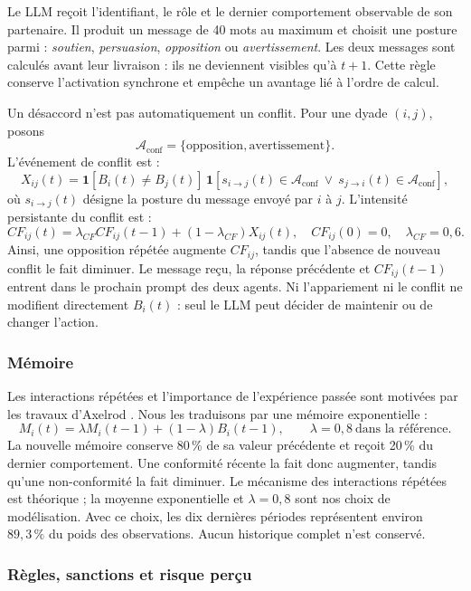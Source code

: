 \documentclass[10pt,a4paper]{article}
\begin{document}
Le LLM reçoit l’identifiant, le rôle et le dernier comportement observable de
son partenaire. Il produit un message de 40 mots au maximum et choisit une
posture parmi : \emph{soutien}, \emph{persuasion}, \emph{opposition} ou
\emph{avertissement}. Les deux messages sont calculés avant leur livraison :
ils ne deviennent visibles qu’à $t+1$. Cette règle conserve l’activation
synchrone et empêche un avantage lié à l’ordre de calcul.

Un désaccord n’est pas automatiquement un conflit. Pour une dyade $(i,j)$,
posons
\[
\mathcal A_{\mathrm{conf}}=\{\text{opposition},\text{avertissement}\}.
\]
L’événement de conflit est :
\[
X_{ij}(t)=
\mathbf 1[B_i(t)\neq B_j(t)]\,
\mathbf 1\!\left[
s_{i\rightarrow j}(t)\in\mathcal A_{\mathrm{conf}}
\ \lor\
s_{j\rightarrow i}(t)\in\mathcal A_{\mathrm{conf}}
\right],
\]
où $s_{i\rightarrow j}(t)$ désigne la posture du message envoyé par $i$ à
$j$. L’intensité persistante du conflit est :
\[
CF_{ij}(t)=\lambda_{CF}CF_{ij}(t-1)
+(1-\lambda_{CF})X_{ij}(t),
\quad CF_{ij}(0)=0,\quad \lambda_{CF}=0{,}6.
\]
Ainsi, une opposition répétée augmente $CF_{ij}$, tandis que l’absence de
nouveau conflit le fait diminuer. Le message reçu, la réponse précédente et
$CF_{ij}(t-1)$ entrent dans le prochain prompt des deux agents. Ni
l’appariement ni le conflit ne modifient directement $B_i(t)$ : seul le LLM
peut décider de maintenir ou de changer l’action.

\subsubsection{Mémoire}

Les interactions répétées et l’importance de l’expérience passée sont motivées
par les travaux d’Axelrod \cite{axelrod2006}. Nous les traduisons par une
mémoire exponentielle :
\[
M_i(t)=\lambda M_i(t-1)+(1-\lambda)B_i(t-1),
\qquad \lambda=0{,}8\ \text{dans la référence}.
\]
La nouvelle mémoire conserve 80\,\% de sa valeur précédente et reçoit 20\,\%
du dernier comportement. Une conformité récente la fait donc augmenter,
tandis qu’une non-conformité la fait diminuer. Le mécanisme des interactions
répétées est théorique ; la moyenne exponentielle et $\lambda=0{,}8$ sont nos
choix de modélisation. Avec ce choix, les dix dernières périodes représentent
environ $89{,}3\,\%$ du poids des observations. Aucun historique complet n’est
conservé.

\subsubsection{Règles, sanctions et risque perçu}
\end{document}
